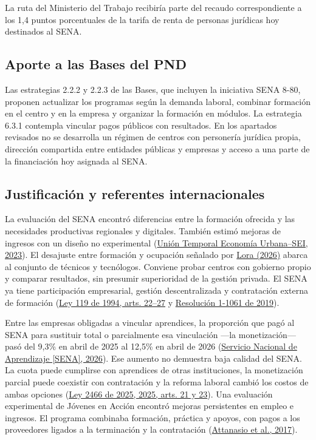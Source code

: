 La ruta del Ministerio del Trabajo recibiría parte del recaudo correspondiente a los 1,4 puntos porcentuales de la tarifa de renta de personas jurídicas hoy destinados al SENA.

\subsection{Aporte a las Bases del PND}

Las estrategias 2.2.2 y 2.2.3 de las Bases, que incluyen la iniciativa SENA 8-80, proponen actualizar los programas según la demanda laboral, combinar formación en el centro y en la empresa y organizar la formación en módulos. La estrategia 6.3.1 contempla vincular pagos públicos con resultados. En los apartados revisados no se desarrolla un régimen de centros con personería jurídica propia, dirección compartida entre entidades públicas y empresas y acceso a una parte de la financiación hoy asignada al SENA.

\subsection{Justificación y referentes internacionales}

La evaluación del SENA encontró diferencias entre la formación ofrecida y las necesidades productivas regionales y digitales. También estimó mejoras de ingresos con un diseño no experimental (\hyperref[ref:bib:dnp_sena_2023]{Unión Temporal Economía Urbana–SEI, 2023}). El desajuste entre formación y ocupación señalado por \hyperref[ref:bib:lora_sena_2026]{Lora (2026)} abarca al conjunto de técnicos y tecnólogos. Conviene probar centros con gobierno propio y comparar resultados, sin presumir superioridad de la gestión privada. El SENA ya tiene participación empresarial, gestión descentralizada y contratación externa de formación (\href{https://normograma.sena.edu.co/compilacion/docs/ley_0119_1994.htm}{Ley 119 de 1994, arts. 22–27} y \href{https://normograma.sena.edu.co/compilacion/docs/resolucion_sena_1061_2019.htm}{Resolución 1-1061 de 2019}).

Entre las empresas obligadas a vincular aprendices, la proporción que pagó al SENA para sustituir total o parcialmente esa vinculación —la monetización— pasó del 9,3\% en abril de 2025 al 12,5\% en abril de 2026 (\hyperref[ref:bib:sena_monetizacion_2026]{Servicio Nacional de Aprendizaje [SENA], 2026}). Ese aumento no demuestra baja calidad del SENA. La cuota puede cumplirse con aprendices de otras instituciones, la monetización parcial puede coexistir con contratación y la reforma laboral cambió los costos de ambas opciones (\href{https://normograma.sena.edu.co/compilacion/docs/ley_2466_2025.htm}{Ley 2466 de 2025, 2025, arts. 21 y 23}). Una evaluación experimental de Jóvenes en Acción encontró mejoras persistentes en empleo e ingresos. El programa combinaba formación, práctica y apoyos, con pagos a los proveedores ligados a la terminación y la contratación (\hyperref[ref:bib:attanasio_2017]{Attanasio et al., 2017}).


